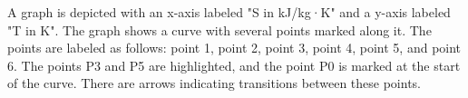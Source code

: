 A graph is depicted with an x-axis labeled "S in kJ/kg·K" and a y-axis labeled "T in K". The graph shows a curve with several points marked along it. The points are labeled as follows: point 1, point 2, point 3, point 4, point 5, and point 6. The points P3 and P5 are highlighted, and the point P0 is marked at the start of the curve. There are arrows indicating transitions between these points.